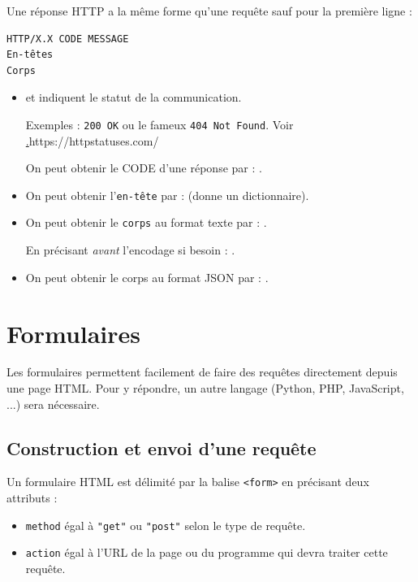 Une réponse HTTP a la même forme qu'une requête sauf pour la première ligne :

\begin{verbatim}
HTTP/X.X CODE MESSAGE
En-têtes
Corps
\end{verbatim}

\begin{itemize}
	\item {} et   indiquent le statut de la communication.
	
	Exemples : \texttt{200 OK} ou le fameux \texttt{404 Not Found}. Voir \href{https://httpstatuses.com/}.{https://httpstatuses.com/}
	
	On peut obtenir le CODE d'une réponse par : .
	\item On peut obtenir l'\texttt{en-tête} par :  (donne un dictionnaire).
	\item On peut obtenir le \texttt{corps} au format texte par : .
	      
	      En précisant \emph{avant} l'encodage si besoin : .
	
	\item On peut obtenir le corps au format JSON par : .
\end{itemize}

\chapter{Formulaires}

Les formulaires permettent facilement de faire des requêtes directement depuis une page HTML. Pour y répondre, un autre langage (Python, PHP, JavaScript, ...) sera nécessaire.

\section{Construction et envoi d'une requête}

Un formulaire HTML est délimité par la balise \texttt{<form>} en précisant deux attributs :

\begin{itemize}
	\item \texttt{method} égal à \texttt{"get"} ou \texttt{"post"} selon le type de requête.
	\item \texttt{action} égal à l'URL de la page ou du programme qui devra traiter cette requête.
\end{itemize}

